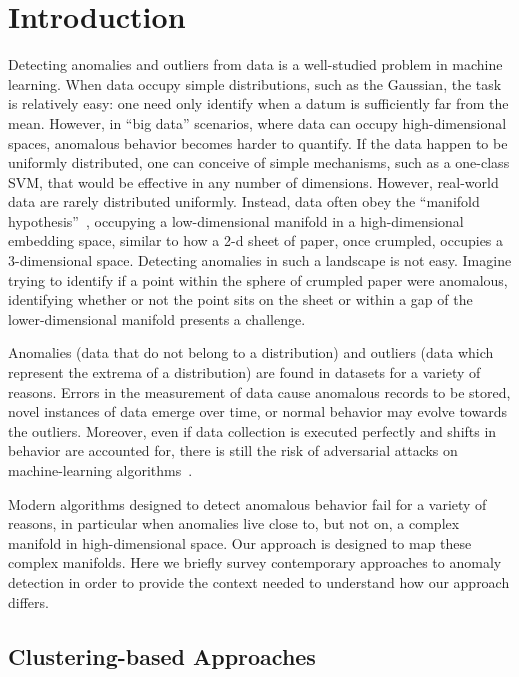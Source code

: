 \section{Introduction}
\label{sec:introduction}

Detecting anomalies and outliers from data is a well-studied problem in machine learning.
When data occupy simple distributions, such as the Gaussian, the task is relatively easy:
one need only identify when a datum is sufficiently far from the mean.
However, in ``big data'' scenarios, where data can occupy high-dimensional spaces, anomalous behavior becomes harder to quantify.
If the data happen to be uniformly distributed, one can conceive of simple mechanisms, such as a one-class SVM, that would be effective in any number of dimensions.
However, real-world data are rarely distributed uniformly.
Instead, data often obey the ``manifold hypothesis''~\cite{fefferman2016testing}, occupying a low-dimensional manifold in a high-dimensional embedding space, similar to how a 2-d sheet of paper, once crumpled, occupies a 3-dimensional space.
Detecting anomalies in such a landscape is not easy.
Imagine trying to identify if a point within the sphere of crumpled paper were anomalous, identifying whether or not the point sits on the sheet or within a gap of the lower-dimensional manifold presents a challenge.

Anomalies (data that do not belong to a distribution) and outliers (data which represent the extrema of a distribution) are found in datasets for a variety of reasons.
Errors in the measurement of data cause anomalous records to be stored,
novel instances of data emerge over time,
or normal behavior may evolve towards the outliers.
Moreover, even if data collection is executed perfectly and shifts in behavior are accounted for, there is still the risk of adversarial attacks on machine-learning algorithms~\cite{elsayed2018adversarial}.

Modern algorithms designed to detect anomalous behavior fail for a variety of reasons, in particular when anomalies live close to, but not on, a complex manifold in high-dimensional space.
Our approach is designed to map these complex manifolds.
Here we briefly survey contemporary approaches to anomaly detection in order to provide the context needed to understand how our approach differs.

\subsection{Clustering-based Approaches}
\label{subsec:introduction:clustering-based-approaches}

